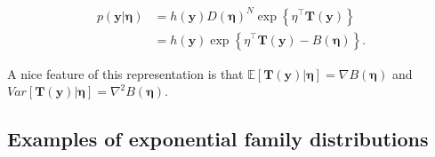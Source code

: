 \begin{align}
	p(\mathbf{y}|\bm{\eta})&=h(\mathbf{y})D(\bm{\eta})^N\exp\left\{\eta^{\top}\mathbf{T}(\mathbf{y})\right\}\nonumber\\
	&=h(\mathbf{y})\exp\left\{\eta^{\top}\mathbf{T}(\mathbf{y})-B(\bm{\eta})\right\}.\nonumber
\end{align}

A nice feature of this representation is that $\mathbb{E}[\mathbf{T}(\mathbf{y})|\bm{\eta}]=\nabla B(\bm{\eta})$ and $Var[\mathbf{T}(\mathbf{y})|\bm{\eta}]=\nabla^2 B(\bm{\eta})$. 

\subsection{Examples of exponential family distributions}

